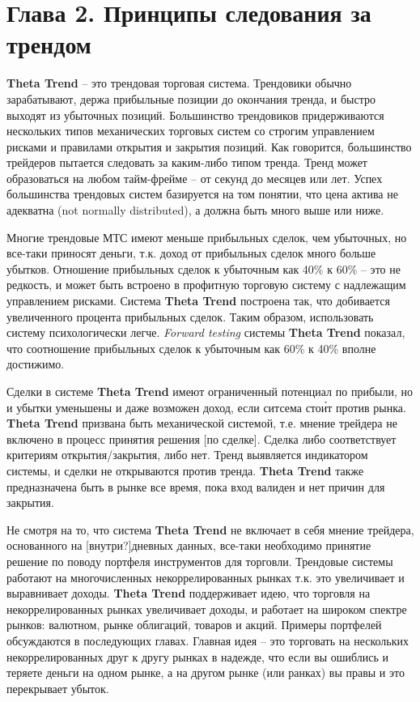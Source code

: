 \documentclass[12pt,DIV=18]{scrartcl}
\begin{document}
\section*{Глава 2. Принципы следования за трендом}
\label{chapter2}
\bigskip

\textbf{Theta Trend} -- это трендовая торговая система. Трендовики обычно зарабатывают, держа прибыльные позиции до окончания тренда, и быстро выходят из убыточных позиций. Большинство трендовиков придерживаются нескольких типов механических торговых систем со строгим управлением рисками и правилами открытия и закрытия позиций. Как говорится, большинство трейдеров пытается следовать за каким-либо типом  тренда. Тренд может образоваться на любом тайм-фрейме -- от секунд до месяцев или лет. Успех большинства трендовых систем базируется на том понятии, что цена актива не адекватна (not normally 
distributed), а должна быть много выше или ниже.

\bigskip

Многие трендовые МТС имеют меньше прибыльных сделок, чем убыточных, но все-таки приносят деньги, т.к. доход от прибыльных сделок много больше убытков. Отношение прибыльных сделок к убыточным как 40\% к 60\% -- это не редкость, и может быть встроено в профитную торговую систему с надлежащим управлением рисками. Система \textbf{Theta Trend} построена так, что добивается увеличенного процента прибыльных сделок. Таким образом, использовать систему психологически легче. \textit{Forward testing} системы \textbf{Theta Trend} показал, что соотношение прибыльных сделок к убыточным как 60\% к 40\% вполне достижимо.

\bigskip

Сделки в системе \textbf{Theta Trend} имеют ограниченный потенциал по прибыли, но и убытки уменьшены и даже возможен доход, если ситсема сто\'{и}т против рынка. \textbf{Theta Trend} призвана быть механической системой, т.е. мнение трейдера не включено в процесс принятия решения [по сделке]. Сделка либо соответствует критериям открытия/закрытия, либо нет. Тренд выявляется индикатором системы, и сделки не открываются против тренда. \textbf{Theta Trend} также предназначена быть в рынке все время, пока вход валиден и нет причин для закрытия.

\bigskip

Не смотря на то, что система \textbf{Theta Trend} не включает в себя мнение трейдера, основанного на [внутри?]дневных данных, все-таки необходимо принятие решение по поводу портфеля инструментов для торговли. Трендовые системы работают на многочисленных некоррелированных рынках т.к. это увеличивает и выравнивает доходы. \textbf{Theta Trend} поддерживает идею, что торговля на некоррелированных рынках увеличивает доходы, и работает на широком спектре рынков: валютном, рынке облигаций, товаров и акций. Примеры портфелей обсуждаются в последующих главах. Главная идея -- это торговать на нескольких некоррелированных друг к другу рынках в надежде, что если вы ошиблись и теряете деньги на одном рынке, а на другом рынке (или ранках) вы правы и это перекрывает убыток.
\end{document}
